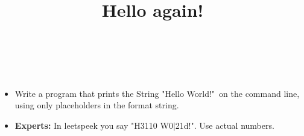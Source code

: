 


\title{Hello again!} %
\author{} %
\renewcommand{\difficulty}{Easy} %
\renewcommand{\requirements}{Variables and input/output} %
\renewcommand{\aims}{Printing on comand line} %


 \maketitle
 \taskinfos
\ \\\ \\
\begin{itemize}
	\item Write a program that prints the String "Hello World!"\ on the command line, using only placeholders in the format string.
	\item \textbf{Experts:} In leetspeek you say "H3110 W0$|$21d!". Use actual numbers.
\end{itemize}


